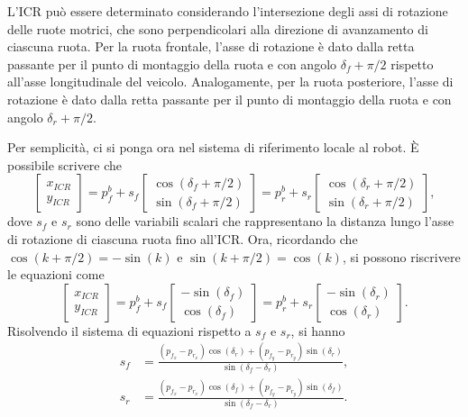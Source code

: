 L'ICR può essere determinato considerando l'intersezione degli assi di rotazione delle ruote motrici, che sono perpendicolari alla direzione di avanzamento di ciascuna ruota. Per la ruota frontale, l'asse di rotazione è dato dalla retta passante per il punto di montaggio della ruota e con angolo $\delta_f + \pi/2$ rispetto all'asse longitudinale del veicolo. Analogamente, per la ruota posteriore, l'asse di rotazione è dato dalla retta passante per il punto di montaggio della ruota e con angolo $\delta_r + \pi/2$.

Per semplicità, ci si ponga ora nel sistema di riferimento locale al robot. È possibile scrivere che
\begin{equation}
    \begin{bmatrix}
        x_{ICR} \\
        y_{ICR}
    \end{bmatrix} =
    p_f^b + s_f \begin{bmatrix}
        \cos(\delta_f + \pi/2) \\
        \sin(\delta_f + \pi/2)
    \end{bmatrix} =
    p_r^b + s_r \begin{bmatrix}
        \cos(\delta_r + \pi/2) \\
        \sin(\delta_r + \pi/2)
    \end{bmatrix},
\end{equation}
dove $s_f$ e $s_r$ sono delle variabili scalari che rappresentano la distanza lungo l'asse di rotazione di ciascuna ruota fino all'ICR. Ora, ricordando che $\cos(k+\pi/2) = -\sin(k)$ e $\sin(k+\pi/2) = \cos(k)$, si possono riscrivere le equazioni come
\begin{equation}
    \begin{bmatrix}
        x_{ICR} \\
        y_{ICR}
    \end{bmatrix} =
    p_f^b + s_f \begin{bmatrix}
        -\sin(\delta_f) \\
        \cos(\delta_f)
    \end{bmatrix} =
    p_r^b + s_r \begin{bmatrix}
        -\sin(\delta_r) \\
        \cos(\delta_r)
    \end{bmatrix}.
\end{equation}
Risolvendo il sistema di equazioni rispetto a $s_f$ e $s_r$, si hanno
\begin{align}
    s_f & =  \frac{(p_{f_x}-p_{r_x})\cos(\delta_r)+(p_{f_y}-p_{r_y})\sin(\delta_r)}{\sin(\delta_f-\delta_r)},\label{eq:sf}  \\
    s_r & = \frac{(p_{f_x} - p_{r_x})\cos(\delta_f)+(p_{f_y}-p_{r_y})\sin(\delta_f)}{\sin(\delta_f-\delta_r)}.\label{eq:sr}
\end{align}
